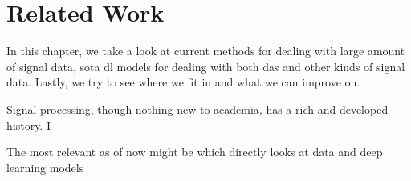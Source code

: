 \chapter{Related Work}
\label{chap:relwork}

In this chapter, we take a look at current methods for dealing with large amount of signal data, \acrfull{sota} \acrlong{dl} models for dealing with both \acrshort{das} and other kinds of signal data. Lastly, we try to see where we fit in and what we can improve on.

Signal processing, though nothing new to academia, has a rich and developed history. I 


The most relevant as of now might be \cite{s21196627} which directly looks at  data and deep learning models




